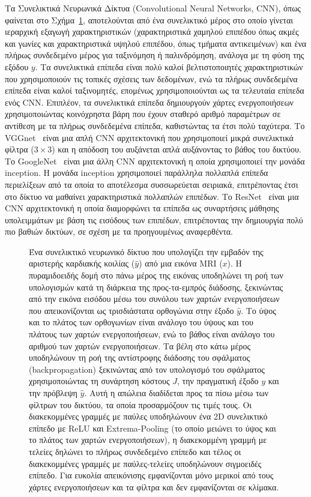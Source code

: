 Τα Συνελικτικά Νευρωνικά Δίκτυα (Convolutional Neural Networks, CNN), όπως φαίνεται στο Σχήμα~\ref{fig:cnn}, αποτελούνται από ένα συνελικτικό μέρος στο οποίο γίνεται ιεραρχική εξαγωγή χαρακτηριστικών (χαρακτηριστικά χαμηλού επιπέδου όπως ακμές και γωνίες και χαρακτηριστικά υψηλού επιπέδου, όπως τμήματα αντικειμένων) και ένα πλήρως συνδεδεμένο μέρος για ταξινόμηση ή παλινδρόμηση, ανάλογα με τη φύση της εξόδου $y$.
Τα συνελικτικά επίπεδα είναι πολύ καλοί βελτιστοποιητές χαρακτηριστικών που χρησιμοποιούν τις τοπικές σχέσεις των δεδομένων, ενώ τα πλήρως συνδεδεμένα επίπεδα είναι καλοί ταξινομητές, επομένως χρησιμοποιούνται ως τα τελευταία επίπεδα ενός CNN\@.
Επιπλέον, τα συνελικτικά επίπεδα δημιουργούν χάρτες ενεργοποιήσεων χρησιμοποιώντας κοινόχρηστα βάρη που έχουν σταθερό αριθμό παραμέτρων σε αντίθεση με τα πλήρως συνδεδεμένα επίπεδα, καθιστώντας τα έτσι πολύ ταχύτερα.
Το VGGnet~\cite{simonyan2014very} είναι μια απλή CNN αρχιτεκτονική που χρησιμοποιεί μικρά συνελικτικά φίλτρα ($3\times 3$) και η απόδοση του αυξάνεται απλά αυξάνοντας το βάθος του δικτύου.
Το GoogleNet~\cite{szegedy2015going} είναι μια άλλη CNN αρχιτεκτονική η οποία χρησιμοποιεί την μονάδα inception.
Η μονάδα inception χρησιμοποιεί παράλληλα πολλαπλά επίπεδα περιελίξεων από τα οποία το αποτέλεσμα συσσωρεύεται σειριακά, επιτρέποντας έτσι στο δίκτυο να μαθαίνει χαρακτηριστικά πολλαπλών επιπέδων.
Το ResNet~\cite{he2016deep} είναι μια CNN αρχιτεκτονική η οποία διαμορφώνει τα επίπεδα ως συναρτήσεις μάθησης υπολειμμάτων με βάση τις εισόδους των επιπέδων, επιτρέποντας την δημιουργία πολύ πιο βαθιών δικτύων, σε σχέση με τα προηγουμένως αναφερθέντα.

\begin{figure}[!t]
	\centering
	
	\caption[Συνελικτικό νευρωνικό δίκτυο]{Ένα συνελικτικό νευρωνικό δίκτυο που υπολογίζει την εμβαδόν της αριστερής καρδιακής κοιλίας ($\hat{y}$) από μια εικόνα MRI ($x$).
	Η πυραμιδοειδής δομή στο πάνω μέρος της εικόνας υποδηλώνει τη ροή των υπολογισμών κατά τη διάρκεια της προς-τα-εμπρός διάδοσης, ξεκινώντας από την εικόνα εισόδου μέσω του συνόλου των χαρτών ενεργοποιήσεων που απεικονίζονται ως τρισδιάστατα ορθογώνια στην έξοδο $\hat{y}$.
	Το ύψος και το πλάτος των ορθογωνίων είναι ανάλογο του ύψους και του πλάτους των χαρτών ενεργοποιήσεων, ενώ το βάθος είναι ανάλογο του αριθμού των χαρτών ενεργοποιήσεων.
	Τα βέλη στο κάτω μέρος υποδηλώνουν τη ροή της αντίστροφης διάδοσης του σφάλματος (backpropagation) ξεκινώντας από τον υπολογισμό του σφάλματος χρησιμοποιώντας τη συνάρτηση κόστους $J$, την πραγματική έξοδο $y$ και την πρόβλεψη $\hat{y}$.
	Αυτή η απώλεια διαδίδεται προς τα πίσω μέσω των φίλτρων του δικτύου, τα οποία προσαρμόζουν τις τιμές τους.
	Οι διακεκομμένες γραμμές με παύλες υποδηλώνουν ένα 2D συνελικτικό επίπεδο με ReLU και Extrema-Pooling (το οποίο μειώνει το ύψος και το πλάτος των χαρτών ενεργοποιήσεων), η διακεκομμένη γραμμή με τελείες δηλώνει το πλήρως συνδεδεμένο επίπεδο και τέλος οι διακεκομμένες γραμμές με παύλες-τελείες υποδηλώνουν σιγμοειδές επίπεδο.
	Για ευκολία απεικόνισης εμφανίζονται μόνο μερικοί από τους χάρτες ενεργοποιήσεων και τα φίλτρα και δεν εμφανίζονται σε κλίμακα.}
	\label{fig:cnn}
\end{figure}

